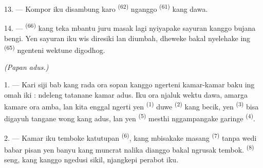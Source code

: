 13. --- Kompor iku disambung karo 
\textsuperscript{(62)} nganggo 
\textsuperscript{(61)} kang dawa.

14. ---  \textsuperscript{(66)} kang teka mbantu
juru masak lagi nyiyapake sayuran kanggo bujana bengi. Yen sayuran iku
wis diresiki lan diumbah, dheweke bakal nyelehake ing 
\textsuperscript{(65)} ngenteni wektune digodhog.

\VUsaut{4.0mm}
{\centering\fontsize{10.2pt}{10.2pt}\selectfont{} \textit{(Papan adus.)}\par}
\VUsaut{3.0mm}

1. --- Kari siji bab kang rada ora sopan kanggo ngerteni kamar-kamar
baku ing omah iki : ndeleng tatanane kamar adus. Iku ora njaluk wektu
dawa, amarga kamare ora amba, lan kita enggal ngerti yen  \textsuperscript{(1)} duwe 
\textsuperscript{(2)} kang becik, yen 
\textsuperscript{(3)} bisa digayuh tangane wong kang adus, lan yen
 \textsuperscript{(5)} mesthi nggampangake
garinge  \textsuperscript{(4)}.

2. --- Kamar iku temboke katutupan 
\textsuperscript{(6)}, kang mbisakake masang 
\textsuperscript{(7)} tanpa wedi babar pisan yen banyu kang muncrat
nalika dianggo bakal ngrusak tembok. 
\textsuperscript{(8)} seng, kang kanggo ngedusi sikil, njangkepi
perabot iku.

\VUsaut{6.0mm}
\VUfilet{22mm}
